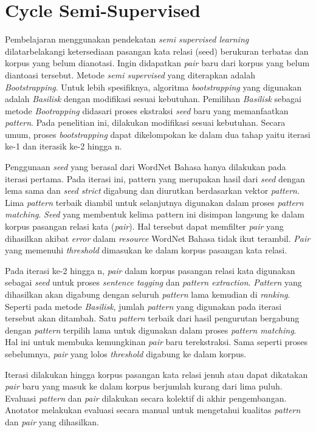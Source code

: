 \section{Cycle Semi-Supervised}
Pembelajaran menggunakan pendekatan \textit{semi supervised learning} dilatarbelakangi ketersediaan pasangan kata relasi (seed) berukuran terbatas dan korpus yang belum dianotasi. Ingin didapatkan \textit{pair} baru dari korpus yang belum diantoasi tersebut. Metode \textit{semi supervised} yang diterapkan adalah \textit{Bootstrapping}. Untuk lebih spesifiknya, algoritma \textit{bootstrapping} yang digunakan adalah \textit{Basilisk} dengan modifikasi sesuai kebutuhan. Pemilihan \textit{Basilisk} sebagai metode \textit{Bootrapping} didasari proses ekstraksi \textit{seed} baru yang memanfaatkan \textit{pattern}. Pada penelitian ini, dilakukan modifikasi sesuai kebutuhan. Secara umum, proses \textit{bootstrapping} dapat dikelompokan ke dalam dua tahap yaitu iterasi ke-1 dan iterasik ke-2 hingga n.

Penggunaan \textit{seed} yang berasal dari WordNet Bahasa hanya dilakukan pada iterasi pertama. Pada iterasi ini, pattern yang merupakan hasil dari \textit{seed} dengan lema sama dan \textit{seed strict} digabung dan diurutkan berdasarkan vektor \textit{pattern}. Lima \textit{pattern} terbaik diambil untuk selanjutnya digunakan dalam proses \textit{pattern matching}. \textit{Seed} yang membentuk kelima pattern ini disimpan langsung ke dalam korpus pasangan relasi kata (\textit{pair}). Hal tersebut dapat memfilter \textit{pair} yang dihasilkan akibat \textit{error} dalam \textit{resource} WordNet Bahasa tidak ikut terambil. \textit{Pair} yang memenuhi \textit{threshold} dimasukan ke dalam korpus pasangan kata relasi. 

Pada iterasi ke-2 hingga n, \textit{pair} dalam korpus pasangan relasi kata digunakan sebagai \textit{seed} untuk proses \textit{sentence tagging} dan \textit{pattern extraction}. \textit{Pattern} yang dihasilkan akan digabung dengan seluruh \textit{pattern} lama kemudian di \textit{ranking}. Seperti pada metode \textit{Basilisk}, jumlah \textit{pattern} yang digunakan pada iterasi tersebut akan ditambah. Satu \textit{pattern} terbaik dari hasil pengurutan bergabung dengan \textit{pattern} terpilih lama untuk digunakan dalam proses \textit{pattern matching}. Hal ini untuk membuka kemungkinan \textit{pair} baru terekstraksi. Sama seperti proses sebelumnya, \textit{pair} yang lolos \textit{threshold} digabung ke dalam korpus.

Iterasi dilakukan hingga korpus pasangan kata relasi jenuh atau dapat dikatakan \textit{pair} baru yang masuk ke dalam korpus berjumlah kurang dari lima puluh. Evaluasi \textit{pattern} dan \textit{pair} dilakukan secara kolektif di akhir pengembangan. Anotator melakukan evaluasi secara manual untuk mengetahui kualitas \textit{pattern} dan \textit{pair} yang dihasilkan.


